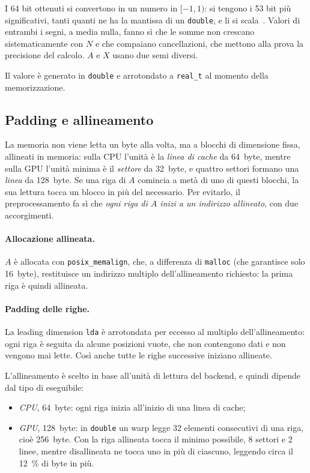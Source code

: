 \documentclass[11pt,a4paper]{article}
\begin{document}
I 64 bit ottenuti si convertono in un numero in $[-1, 1)$: si tengono i 53 bit
più significativi, tanti quanti ne ha la mantissa di un \texttt{double}, e li
si scala~\cite{vigna}. Valori di entrambi i segni, a media nulla, fanno sì che
le somme non crescano sistematicamente con $N$ e che compaiano cancellazioni,
che mettono alla prova la precisione del calcolo. $A$ e $X$ usano due semi
diversi.

Il valore è generato in \texttt{double} e arrotondato a \texttt{real\_t} al
momento della memorizzazione. 

\subsection{Padding e allineamento}\label{sec:padding}

La memoria non viene letta un byte alla volta, ma a blocchi di dimensione
fissa, allineati in memoria: sulla CPU l'unità è la \emph{linea di cache} da
\SI{64}{byte}, mentre sulla GPU l'unità minima è il \emph{settore} da
\SI{32}{byte}, e quattro settori formano una \emph{linea} da \SI{128}{byte}.
Se una riga di $A$ comincia a metà di uno di questi blocchi, la sua lettura
tocca un blocco in più del necessario. Per evitarlo, il preprocessamento fa sì
che \emph{ogni riga di $A$ inizi a un indirizzo allineato}, con due
accorgimenti.

\paragraph{Allocazione allineata.} $A$ è allocata con
\texttt{posix\_memalign}, che, a differenza di \texttt{malloc} (che garantisce
solo \SI{16}{byte}), restituisce un indirizzo multiplo dell'allineamento
richiesto: la prima riga è quindi allineata.

\paragraph{Padding delle righe.} La leading dimension \texttt{lda} è
arrotondata per eccesso al multiplo dell'allineamento: ogni riga è seguita da
alcune posizioni vuote, che non contengono dati e non vengono mai lette. Così
anche tutte le righe successive iniziano allineate.

\medskip
L'allineamento è scelto in base all'unità di lettura del backend, e quindi dipende dal tipo di eseguibile:
\begin{itemize}
  \item \emph{CPU}, \SI{64}{byte}: ogni riga inizia all'inizio di una linea di
        cache;
  \item \emph{GPU}, \SI{128}{byte}: in \texttt{double} un warp legge 32
        elementi consecutivi di una riga, cioè \SI{256}{byte}. Con la riga
        allineata tocca il minimo possibile, 8 settori e 2 linee, mentre disallineata
        ne tocca uno in più di ciascuno, leggendo circa il \SI{12}{\percent} di
        byte in più.
\end{itemize}
\end{document}
